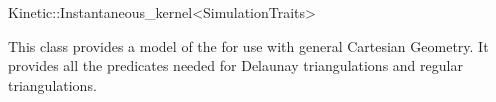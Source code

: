 

\begin{ccRefClass}{Kinetic::Instantaneous_kernel<SimulationTraits>}  %


\ccDefinition
  
This class provides a model of the  for
use with general Cartesian Geometry. It provides all the predicates
needed for Delaunay triangulations and regular triangulations.


\ccIsModel


\end{ccRefClass}


